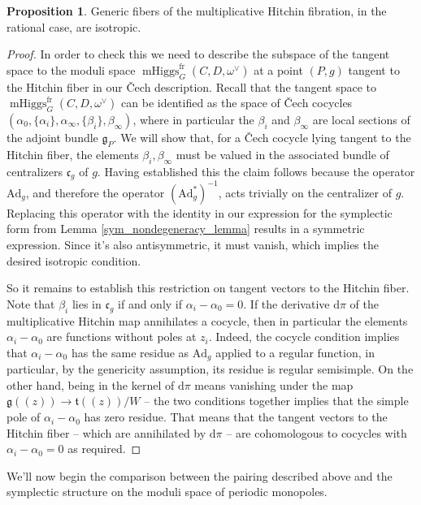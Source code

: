 \documentclass[11pt, oneside, reqno]{amsart}
\theoremstyle{definition} \newtheorem{definition}{Definition}[section]
\newtheorem{prop}[definition]{Proposition}
\theoremstyle{definition} \newtheorem{remark}[definition]{Remark}
\theoremstyle{definition} \newtheorem{remarks}[definition]{Remarks}
\theoremstyle{definition} \newtheorem{question}[definition]{Question}
\theoremstyle{definition} \newtheorem*{note}{Note}
\theoremstyle{definition} \newtheorem{example}[definition]{Example}
\theoremstyle{definition} \newtheorem{examples}[definition]{Examples}
\renewcommand{\gg}{\mathfrak{g}}
\newcommand{\mr}[1]{\mathrm{#1}}
\newcommand{\mf}[1]{\mathfrak{#1}}
\DeclareMathOperator{\mhiggs}{mHiggs}
\renewcommand{\d}{\mathrm{d}}
\newcommand{\fr}{\mathrm{fr}}
\newcommand{\Ad}{\mr{Ad}}
\begin{document}
\begin{prop} \label{Hitchin_isotropic_prop}
Generic fibers of the multiplicative Hitchin fibration, in the rational case, are isotropic.
\end{prop}

\begin{proof}
In order to check this we need to describe the subspace of the tangent space to the moduli space $\mhiggs^\fr_G(C,D,\omega^\vee)$ at a point $(P,g)$ tangent to the Hitchin fiber in our \v Cech description.  Recall that the tangent space to $\mhiggs^\fr_G(C,D,\omega^\vee)$ can be identified as the space of \v Cech cocycles $(\alpha_0, \{\alpha_i\}, \alpha_\infty, \{\beta_i\}, \beta_\infty)$, where in particular the $\beta_i$ and $\beta_\infty$ are local sections of the adjoint bundle $\gg_P$.  We will show that, for a \v Cech cocycle lying tangent to the Hitchin fiber, the elements $\beta_i, \beta_\infty$ must be valued in the associated bundle of centralizers $\mf c_g$ of $g$.  Having established this the claim follows because the operator $\Ad_g$, and therefore the operator $(\Ad_g^*)^{-1}$, acts trivially on the centralizer of $g$.  Replacing this operator with the identity in our expression for the symplectic form from Lemma \ref{sym_nondegeneracy_lemma} results in a symmetric expression.  Since it's also antisymmetric, it must vanish, which implies the desired isotropic condition.

So it remains to establish this restriction on tangent vectors to the Hitchin fiber.  Note that $\beta_i$ lies in $\mf c_g$ if and only if $\alpha_i - \alpha_0 = 0$.  If the derivative $\d \pi$ of the multiplicative Hitchin map annihilates a cocycle, then in particular the elements $\alpha_i - \alpha_0$ are functions without poles at $z_i$.  Indeed, the cocycle condition implies that $\alpha_i - \alpha_0$ has the same residue as $\Ad_g$ applied to a regular function, in particular, by the genericity assumption, its residue is regular semisimple.  On the other hand, being in the kernel of $\d \pi$ means vanishing under the map $\gg(\!(z)\!) \to \mf t(\!(z)\!)/W$ -- the two conditions together implies that the simple pole of $\alpha_i - \alpha_0$ has zero residue.  That means that the tangent vectors to the Hitchin fiber -- which are annihilated by $\d \pi$ -- are cohomologous to cocycles with $\alpha_i - \alpha_0 = 0$ as required.
\end{proof}

We'll now begin the comparison between the pairing described above and the symplectic structure on the moduli space of periodic monopoles.
\end{document}
